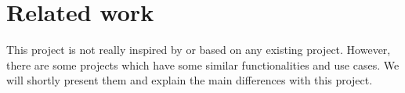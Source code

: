 \chapter{Related work}
\label{chap:related-work}
%
This project is not really inspired by or based on any existing project. However, there 
are some projects which have some similar functionalities and use cases. We will 
shortly present them and explain the main differences with this project.
%

%

%